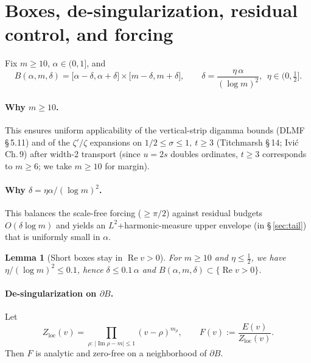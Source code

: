 \documentclass[11pt]{article}
\numberwithin{equation}{section}
\newtheorem{lemma}[theorem]{Lemma}
\theoremstyle{remark}
\DeclareMathOperator{\Imag}{Im}
\DeclareMathOperator{\Real}{Re}
\newcommand{\Zloc}{Z_{\mathrm{loc}}}
\begin{document}
\section{Boxes, de-singularization, residual control, and forcing}\label{sec:boxes}

Fix $m\ge 10$, $\alpha\in(0,1]$, and
\begin{equation}\label{eq:box-delta}
B(\alpha,m,\delta)=\big[\alpha-\delta,\alpha+\delta\big]\times\big[m-\delta,m+\delta\big],
\qquad
\delta=\frac{\eta\,\alpha}{(\log m)^2},\ \ \eta\in(0,\tfrac12].
\end{equation}

\paragraph{Why $m\ge 10$.}
This ensures uniform applicability of the vertical-strip digamma bounds (DLMF §\,5.11) and of the $\zeta'/\zeta$ expansions on $1/2\le\sigma\le1,\ t\ge 3$ (Titchmarsh §\,14; Ivi\'c Ch.\,9) after width-2 transport (since $u=2s$ doubles ordinates, $t\ge3$ corresponds to $m\ge 6$; we take $m\ge10$ for margin).

\paragraph{Why $\delta=\eta\alpha/(\log m)^2$.}
This balances the scale-free forcing ($\ge\pi/2$) against residual budgets $O(\delta\log m)$ and yields an $L^2$+harmonic-measure upper envelope (in §\,\ref{sec:tail}) that is uniformly small in $\alpha$.

\begin{lemma}[Short boxes stay in $\Real v>0$]\label{lem:box-right}
For $m\ge10$ and $\eta\le\tfrac12$, we have $\eta/(\log m)^2\le 0.1$, hence $\delta\le 0.1\,\alpha$ and $B(\alpha,m,\delta)\subset\{\Real v>0\}$.
\end{lemma}

\paragraph{De-singularization on $\partial B$.}
Let
\begin{equation}\label{eq:Zloc}
\Zloc(v)=\prod_{\rho:\,|\Imag\rho-m|\le 1}(v-\rho)^{m_\rho},\qquad
F(v):=\frac{E(v)}{\Zloc(v)}.
\end{equation}
Then $F$ is analytic and zero-free on a neighborhood of $\partial B$.
\end{document}

